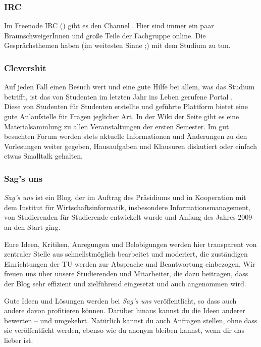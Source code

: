 \subsubsection*{IRC}

Im Freenode IRC () gibt es den Channel . Hier
sind immer ein paar BraunschweigerInnen und große Teile der Fachgruppe online. Die Gesprächsthemen haben (im weitesten
Sinne ;) mit dem Studium zu tun.

\subsubsection*{Clevershit}

Auf jeden Fall einen Besuch wert und eine gute Hilfe bei allem, was das Studium betrifft, ist das von Studenten im letzten Jahr ins Leben gerufene Portal \mbox{}.\\
Diese von Studenten für Studenten erstellte und geführte Plattform bietet eine gute Anlaufstelle für Fragen jeglicher Art. In der Wiki der Seite gibt es eine Materialsammlung zu allen Veranstaltungen der ersten Semester. Im gut besuchten Forum werden stets aktuelle Informationen und Änderungen zu den Vorlesungen weiter gegeben, Hausaufgaben und Klausuren diskutiert oder einfach etwas Smalltalk gehalten.

\subsubsection*{Sag's uns}
\emph{Sag's uns} ist ein Blog, der im Auftrag des Präsidiums und in Kooperation mit dem Institut für Wirtschaftsinformatik, insbesondere Informationsmanagement, von Studierenden für Studierende entwickelt wurde und Anfang des Jahres 2009 an den Start ging.

Eure Ideen, Kritiken, Anregungen und Belobigungen werden hier transparent von zentraler Stelle aus schnellstmöglich bearbeitet und moderiert, die zuständigen Einrichtungen der TU werden zur Absprache und Beantwortung einbezogen. 
Wir freuen uns über unsere Studierenden und Mitarbeiter, die dazu beitragen, dass der Blog sehr effizient und zielführend eingesetzt und auch angenommen wird.

Gute Ideen und Lösungen werden bei \emph{Sag's uns} veröffentlicht, so dass auch andere davon profitieren können.
Darüber hinaus kannst du die Ideen anderer bewerten – und umgekehrt. Natürlich kannst du auch Anfragen stellen, ohne dass sie veröffentlicht werden, ebenso wie du anonym bleiben kannst, wenn dir das lieber ist.


